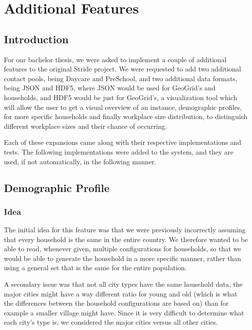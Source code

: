 \chapter{Additional Features}
\label{chap:code}


\section{Introduction}
\label{section:AdditionalFeatureIntro}

For our bachelor thesis, we were asked to implement a couple of additional features to the original Stride project. We were requested to add two additional contact pools, being Daycare and PreSchool, and two additional data formats, being JSON and HDF5, where JSON would be used for GeoGrid's and households, and HDF5 would be just for GeoGrid's, a visualization tool which will allow the user to get a visual overview of an instance, demographic profiles, for more specific households and finally workplace size distribution, to distinguish different workplace sizes and their chance of occurring.

Each of these expansions came along with their respective implementations and tests. The following implementations were added to the system, and they are used, if not automatically, in the following manner.



\section{Demographic Profile}
\label{section:demographicprofile}

\subsection{Idea}

The initial idea for this feature was that we were previously incorrectly assuming that every household is the same in the entire country. We therefore wanted to be able to read, whenever given, multiple configurations for households, so that we would be able to generate the household in a more specific manner, rather than using a general set that is the same for the entire population.

A secondary issue was that not all city types have the same household data, the major cities might have a way different ratio for young and old (which is what the differences between the household configurations are based on) than for example a smaller village might have. Since it is very difficult to determine what each city's type is, we considered the major cities versus all other cities.


